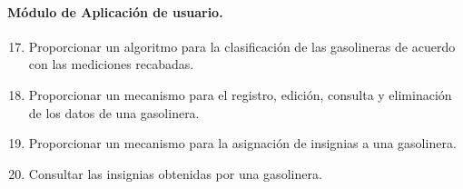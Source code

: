 \paragraph{Módulo de Aplicación de usuario.}
\begin{enumerate}[label=RF\arabic*.]
	\setcounter{enumi}{16}
	\item Proporcionar un algoritmo para la clasificación de las gasolineras de acuerdo con las mediciones recabadas.
	\item Proporcionar un mecanismo para el registro, edición, consulta y eliminación de los datos de una gasolinera.
	\item Proporcionar un mecanismo para la asignación de insignias a una gasolinera.
	\item Consultar las insignias obtenidas por una gasolinera.
\end{enumerate}
